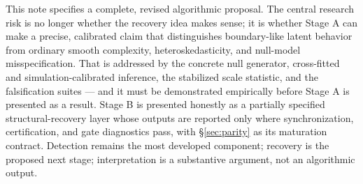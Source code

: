\documentclass[11pt]{article}
\begin{document}
This note specifies a complete, revised algorithmic proposal. The central research risk is no
longer whether the recovery idea makes sense; it is whether Stage A can make a precise,
calibrated claim that distinguishes boundary-like latent behavior from ordinary smooth
complexity, heteroskedasticity, and null-model misspecification. That is addressed by the
concrete null generator, cross-fitted and simulation-calibrated inference, the stabilized
scale statistic, and the falsification suites --- and it must be demonstrated empirically
before Stage A is presented as a result. Stage B is presented honestly as a partially
specified structural-recovery layer whose outputs are reported only where synchronization,
certification, and gate diagnostics pass, with \S\ref{sec:parity} as its maturation
contract. Detection remains the most developed component; recovery is the proposed next
stage; interpretation is a substantive argument, not an algorithmic output.
\end{document}
